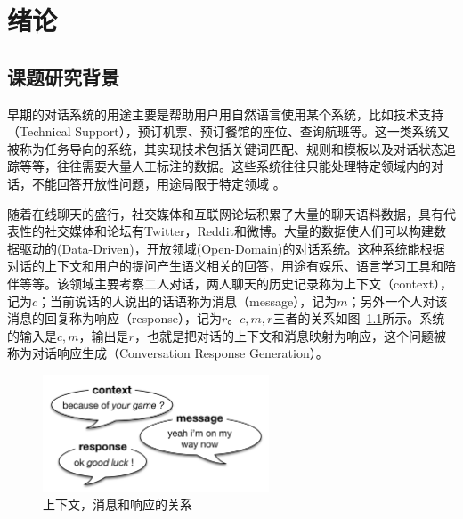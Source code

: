 
\chapter{绪论}\label{ch:绪论}

\section{课题研究背景}\label{sec:课题研究背景}
早期的对话系统的用途主要是帮助用户用自然语言使用某个系统，比如技术支持（Technical Support），预订机票、预订餐馆的座位、查询航班等。这一类系统又被称为任务导向的系统，其实现技术包括关键词匹配、规则和模板以及对话状态追踪等等，往往需要大量人工标注的数据。这些系统往往只能处理特定领域内的对话，不能回答开放性问题，用途局限于特定领域
。

随着在线聊天的盛行，社交媒体和互联网论坛积累了大量的聊天语料数据，具有代表性的社交媒体和论坛有Twitter，Reddit和微博。大量的数据使人们可以构建数据驱动的(Data-Driven)，开放领域(Open-Domain)的对话系统。这种系统能根据对话的上下文和用户的提问产生语义相关的回答，用途有娱乐、语言学习工具和陪伴等等。该领域主要考察二人对话，两人聊天的历史记录称为上下文（context），记为$c$；当前说话的人说出的话语称为消息（message），记为$m$；另外一个人对该消息的回复称为响应（response），记为$r$。$c,m,r$三者的关系如图~\ref{fig:context_message_response}所示。系统的输入是$c,m$，输出是$r$，也就是把对话的上下文和消息映射为响应，这个问题被称为对话响应生成（Conversation Response Generation）。

\begin{figure}[H]
    \includegraphics[width=0.6\textwidth]{figure/context_message_response.png}
    \centering
    \caption{上下文，消息和响应的关系}
    \label{fig:context_message_response}
\end{figure}

